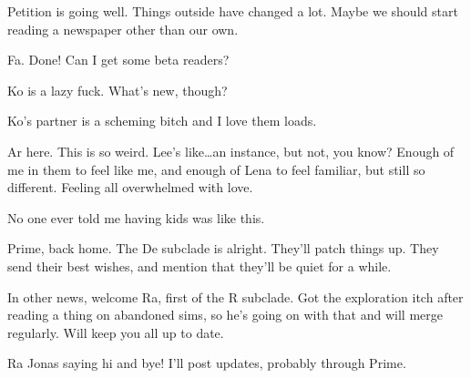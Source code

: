 Petition is going well. Things outside have changed a lot. Maybe we should start reading a newspaper other than our own.

\secdiv{}

\noindent Fa. Done! Can I get some beta readers?

\secdiv{}

\noindent Ko is a lazy fuck. What's new, though?

\secdiv{}

\noindent Ko's partner is a scheming bitch and I love them loads.

\secdiv{}

\noindent Ar here. This is so weird. Lee's like\ldots{}an instance, but not, you know? Enough of me in them to feel like me, and enough of Lena to feel familiar, but still so different. Feeling all overwhelmed with love.

No one ever told me having kids was like this.

\secdiv{}

\noindent Prime, back home. The De subclade is alright. They'll patch things up. They send their best wishes, and mention that they'll be quiet for a while.

In other news, welcome Ra, first of the R subclade. Got the exploration itch after reading a thing on abandoned sims, so he's going on with that and will merge regularly. Will keep you all up to date.

\secdiv{}

\noindent Ra Jonas saying hi and bye! I'll post updates, probably through Prime.
